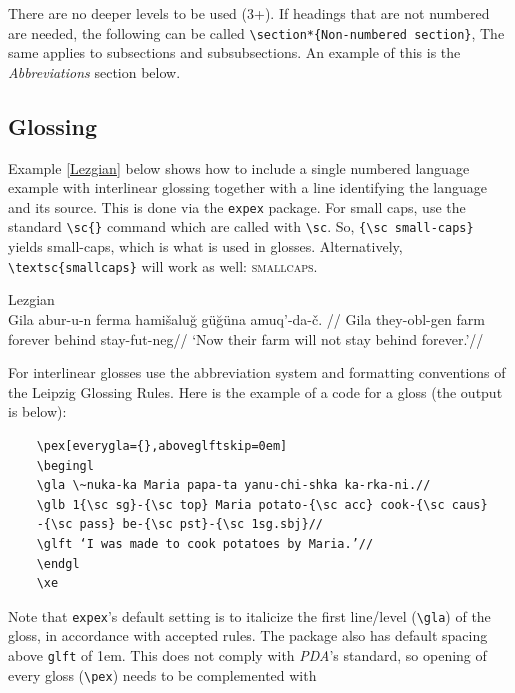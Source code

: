 \documentclass[11pt, letterpaper]{article}
\begin{document}
There are no deeper levels to be used (3+). If headings that are not numbered are needed, the following can be called
\pex
\verb=\section*{Non-numbered section}=,
\xe
The same applies to subsections and subsubsections. An example of this is the \textit{Abbreviations} section below.

\subsection{Glossing}\label{gloss}
Example \ref{Lezgian} below shows how to include a single numbered language example with interlinear glossing together with a line identifying the language and its source. This is done via the \verb=expex= package. For small caps, use the standard \verb=\sc{}= command which are called with \verb=\sc=. So, \verb={\sc small-caps}= yields {\sc small-caps}, which is what is used in glosses. Alternatively, \verb=\textsc{smallcaps}= will work as well: \textsc{smallcaps}.

\pex[everygla={},aboveglftskip=0em] \label{Lezgian} Lezgian \citep[from][207]{haspelmath_1993}\\
\begingl
\gla Gila abur-u-n ferma hami\v{s}alu\u{g} g\"{u}\u{g}\"{u}na amuq’-da-\v{c}. //
\glb Gila they-{\sc obl}-{\sc gen} farm forever behind stay-{\sc fut}-{\sc neg}//
\glft ‘Now their farm will not stay behind forever.’//
\endgl
\xe

For interlinear glosses use the abbreviation system and formatting conventions of the Leipzig Glossing Rules. Here is the example of a code for a gloss (the output is below):

\begin{verbatim}
    \pex[everygla={},aboveglftskip=0em]
    \begingl
    \gla \~nuka-ka Maria papa-ta yanu-chi-shka ka-rka-ni.//
    \glb 1{\sc sg}-{\sc top} Maria potato-{\sc acc} cook-{\sc caus}
    -{\sc pass} be-{\sc pst}-{\sc 1sg.sbj}//
    \glft ‘I was made to cook potatoes by Maria.’//
    \endgl
    \xe
\end{verbatim}

Note that \verb=expex='s default setting is to italicize the first line/level (\verb=\gla=) of the gloss, in accordance with accepted rules. The package also has default spacing above \verb=glft= of 1em. This does not comply with \textit{PDA}'s standard, so opening of every gloss (\verb=\pex=) needs to be complemented with
\end{document}
